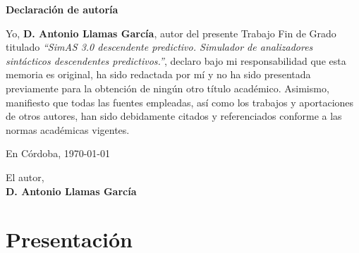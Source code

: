 \documentclass[a4paper,12pt,twoside,final]{book}
\begin{document}
\cleardoublepage
\thispagestyle{empty}
\pagecolor{white}

\begin{center}
\Huge{\textbf{Declaración de autoría}}
\end{center}

\vspace{1.5cm}

\noindent Yo, \textbf{D. Antonio Llamas García}, autor del presente Trabajo Fin de Grado titulado 
\textit{“SimAS 3.0 descendente predictivo. Simulador de analizadores sintácticos descendentes predictivos.”}, 
declaro bajo mi responsabilidad que esta memoria es original, ha sido redactada por mí y no ha sido presentada previamente para la obtención de ningún otro título académico. 
Asimismo, manifiesto que todas las fuentes empleadas, así como los trabajos y aportaciones de otros autores, 
han sido debidamente citados y referenciados conforme a las normas académicas vigentes.

\vspace{2cm}

\begin{flushright}
En Córdoba, \monthyeardate\today
\end{flushright}

\vspace{2cm}

\begin{flushleft}
El autor,\\[2cm]
\textbf{D. Antonio Llamas García}
\end{flushleft}

\clearpage

\thispagestyle{empty}
\pagecolor{white}


\cleardoublepage
\setcounter{page}{1}
\setcounter{tocdepth}{3} %
\setcounter{secnumdepth}{3} %
\tableofcontents
\listoffigures
\listoftables

\afterpage{\null\newpage}
\thispagestyle{empty}
\newpage
\mainmatter
\part{Presentación}





\end{document}

